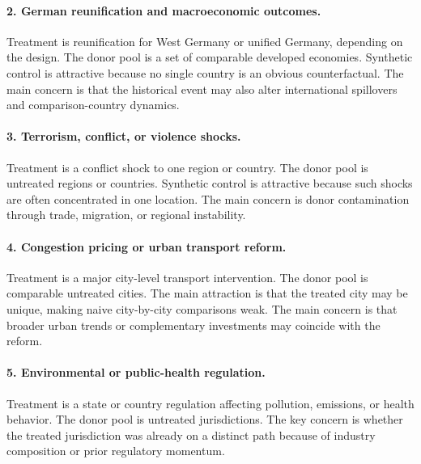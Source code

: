 \paragraph{2. German reunification and macroeconomic outcomes.}
Treatment is reunification for West Germany or unified Germany, depending on the design. The donor pool is a set of comparable developed economies. Synthetic control is attractive because no single country is an obvious counterfactual. The main concern is that the historical event may also alter international spillovers and comparison-country dynamics.

\paragraph{3. Terrorism, conflict, or violence shocks.}
Treatment is a conflict shock to one region or country. The donor pool is untreated regions or countries. Synthetic control is attractive because such shocks are often concentrated in one location. The main concern is donor contamination through trade, migration, or regional instability.

\paragraph{4. Congestion pricing or urban transport reform.}
Treatment is a major city-level transport intervention. The donor pool is comparable untreated cities. The main attraction is that the treated city may be unique, making naive city-by-city comparisons weak. The main concern is that broader urban trends or complementary investments may coincide with the reform.

\paragraph{5. Environmental or public-health regulation.}
Treatment is a state or country regulation affecting pollution, emissions, or health behavior. The donor pool is untreated jurisdictions. The key concern is whether the treated jurisdiction was already on a distinct path because of industry composition or prior regulatory momentum.

